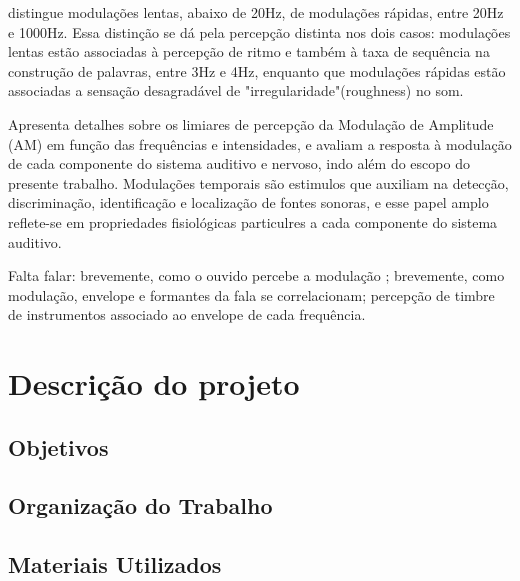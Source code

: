 \citet{langner1992} distingue modulações lentas, abaixo de 20Hz, de
modulações rápidas, entre 20Hz e 1000Hz. Essa distinção se dá pela percepção
distinta nos dois casos: modulações lentas estão associadas à percepção de
ritmo e também à taxa de sequência na construção de palavras, entre 3Hz e 4Hz,
enquanto que modulações rápidas estão associadas a sensação desagradável
de "irregularidade"(roughness) no som. 

\citet{zwicker2013} Apresenta detalhes sobre os limiares de percepção da
Modulação de Amplitude (AM) em função das frequências e intensidades, \citet{joris2004} e
\citet{langner1992} avaliam a resposta à modulação de cada componente do 
sistema auditivo e nervoso, indo além do escopo do
presente trabalho. Modulações temporais são estimulos que auxiliam na detecção,
discriminação, identificação e localização de fontes sonoras,
e esse papel amplo reflete-se em propriedades fisiológicas particulres a cada
componente do sistema auditivo. 

Falta falar: brevemente, como o ouvido percebe a modulação ; brevemente, como modulação,
 envelope e formantes da fala se correlacionam; percepção de timbre de instrumentos
  associado ao envelope de cada frequência.

\section{Descrição do projeto}
\subsection{Objetivos}
\subsection{Organização do Trabalho}
\subsection{Materiais Utilizados}
